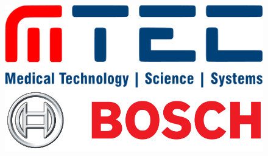 \documentclass[12pt, a4paper, twoside, openright]{report}
\begin{document}
\vspace{2cm}
\begin{figure}[ht]
\centering%
\includegraphics[width=.35\textwidth]{figures/logo_mtec.pdf}
\hspace{40pt}
\includegraphics[width=.45\textwidth]{figures/bosch_logo.png}
\end{figure}

\afterpage{\thispagestyle{empty}}
\cleardoublepage


\setcounter{pageno}{1} %
\addtocounter{pageno}{1}

%


\afterpage{\thispagestyle{empty}}
\cleardoublepage


\afterpage{\thispagestyle{empty}}
\cleardoublepage


\afterpage{\thispagestyle{empty}}
\cleardoublepage

\thispagestyle{empty}
\tableofcontents  
\afterpage{\thispagestyle{empty}}
\cleardoublepage
%
% 

% 
% 
% 
% 

\listoffigures
\afterpage{\thispagestyle{empty}}
\cleardoublepage

\listoftables
\afterpage{\thispagestyle{empty}}
\cleardoublepage
\setcounter{page}{1}
\renewcommand{\thepage}{\arabic{page}}



\cleardoublepage


\cleardoublepage

\end{document}
